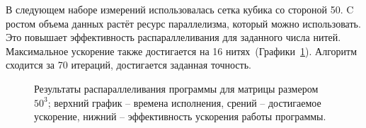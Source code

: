 \documentclass[12pt, oneside, a4paper]{article}
\begin{document}
В следующем наборе измерений использовалась сетка кубика со стороной 50. C ростом объема данных растёт ресурс параллелизма, который можно использовать. Это повышает эффективность распараллеливания для заданного числа нитей. Максимальное ускорение также достигается на 16 нитях~(Графики~\ref{fig:m50}). Алгоритм сходится за 70 итераций, достигается заданная точность.

\begin{figure}[h!]
\caption{Результаты распараллеливания программы для матрицы размером $50^3$; верхний график -- времена исполнения, срений -- достигаемое ускорение, нижний -- эффективность ускорения работы программы.}
\label{fig:m50}
\end{figure}
\end{document}
